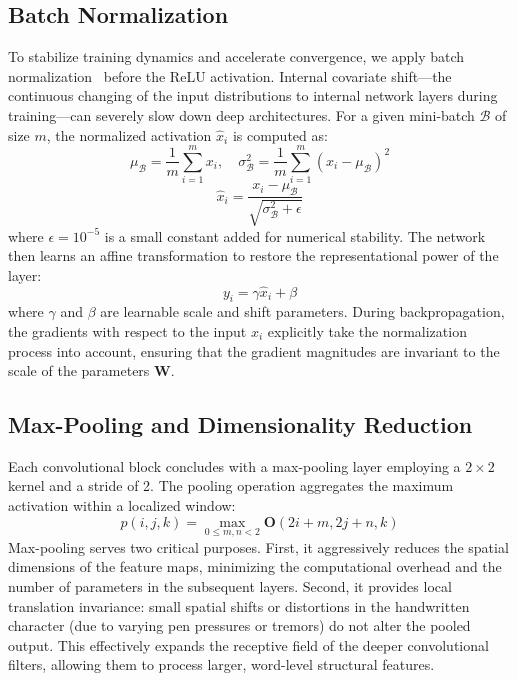 \subsection{Batch Normalization}
To stabilize training dynamics and accelerate convergence, we apply batch normalization~\cite{ioffe2015batch} before the ReLU activation. Internal covariate shift—the continuous changing of the input distributions to internal network layers during training—can severely slow down deep architectures. For a given mini-batch $\mathcal{B}$ of size $m$, the normalized activation $\hat{x}_i$ is computed as:
\begin{equation}
    \mu_{\mathcal{B}} = \frac{1}{m} \sum_{i=1}^m x_i, \quad \sigma_{\mathcal{B}}^2 = \frac{1}{m} \sum_{i=1}^m (x_i - \mu_{\mathcal{B}})^2
\end{equation}
\begin{equation}
    \hat{x}_i = \frac{x_i - \mu_{\mathcal{B}}}{\sqrt{\sigma_{\mathcal{B}}^2 + \epsilon}}
\end{equation}
where $\epsilon = 10^{-5}$ is a small constant added for numerical stability. The network then learns an affine transformation to restore the representational power of the layer:
\begin{equation}
    y_i = \gamma \hat{x}_i + \beta
\end{equation}
where $\gamma$ and $\beta$ are learnable scale and shift parameters. During backpropagation, the gradients with respect to the input $x_i$ explicitly take the normalization process into account, ensuring that the gradient magnitudes are invariant to the scale of the parameters $\mathbf{W}$.

\subsection{Max-Pooling and Dimensionality Reduction}
Each convolutional block concludes with a max-pooling layer employing a $2 \times 2$ kernel and a stride of 2. The pooling operation aggregates the maximum activation within a localized window:
\begin{equation}
    p(i, j, k) = \max_{0 \le m, n < 2} \mathbf{O}(2i+m, 2j+n, k)
\end{equation}
Max-pooling serves two critical purposes. First, it aggressively reduces the spatial dimensions of the feature maps, minimizing the computational overhead and the number of parameters in the subsequent layers. Second, it provides local translation invariance: small spatial shifts or distortions in the handwritten character (due to varying pen pressures or tremors) do not alter the pooled output. This effectively expands the receptive field of the deeper convolutional filters, allowing them to process larger, word-level structural features.

